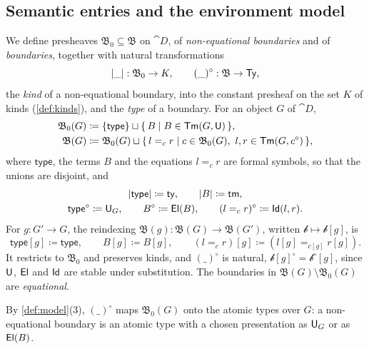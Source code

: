 \subsection{Semantic entries and the environment model}
\label{sec:environment-model}

\begin{definition}\label{def:boundary}
    We define presheaves $\mathfrak{B}_0 \subseteq \mathfrak{B}$ on $\cat{D}$, of \emph{non-equational boundaries} and of \emph{boundaries}, together with natural transformations
    \[
        |\_| : \mathfrak{B}_0 \to K, \qquad (\_)^{\circ} : \mathfrak{B} \to \mathsf{Ty},
    \]
    the \emph{kind} of a non-equational boundary, into the constant presheaf on the set $K$ of kinds (\cref{def:kinds}), and the \emph{type} of a boundary. For an object $G$ of $\cat{D}$,
    \begin{align*}
        \mathfrak{B}_0(G) &\coloneqq \{\mathsf{type}\} \sqcup \{\, B \mid B \in \mathsf{Tm}(G, \mathsf{U}) \,\},\\
        \mathfrak{B}(G) &\coloneqq \mathfrak{B}_0(G) \sqcup \{\, l =_c r \mid c \in \mathfrak{B}_0(G),\ l, r \in \mathsf{Tm}(G, c^{\circ}) \,\},
    \end{align*}
    where $\mathsf{type}$, the terms $B$ and the equations $l =_c r$ are formal symbols, so that the unions are disjoint, and
    \begin{gather*}
        |\mathsf{type}| \coloneqq \mathsf{ty}, \qquad |B| \coloneqq \mathsf{tm},\\
        \mathsf{type}^{\circ} \coloneqq \mathsf{U}_G, \qquad B^{\circ} \coloneqq \mathsf{El}(B), \qquad (l =_c r)^{\circ} \coloneqq \mathsf{Id}(l, r).
    \end{gather*} For $g : G' \to G$, the reindexing $\mathfrak{B}(g) : \mathfrak{B}(G) \to \mathfrak{B}(G')$, written $\mathscr{b} \mapsto \mathscr{b}[g]$, is
    \[
        \mathsf{type}[g] \coloneqq \mathsf{type}, \qquad B[g] \coloneqq B[g], \qquad (l =_c r)[g] \coloneqq (l[g] =_{c[g]} r[g]).
    \]
    It restricts to $\mathfrak{B}_0$ and preserves kinds, and $(\_)^{\circ}$ is natural, $\mathscr{b}[g]^{\circ} = \mathscr{b}^{\circ}[g]$, since $\mathsf{U}$, $\mathsf{El}$ and $\mathsf{Id}$ are stable under substitution. The boundaries in $\mathfrak{B}(G) \setminus \mathfrak{B}_0(G)$ are \emph{equational}.
\end{definition}

By \cref{def:model}(3), $(\_)^{\circ}$ maps $\mathfrak{B}_0(G)$ onto the atomic types over $G$: a non-equational boundary is an atomic type with a chosen presentation as $\mathsf{U}_G$ or as $\mathsf{El}(B)$.

